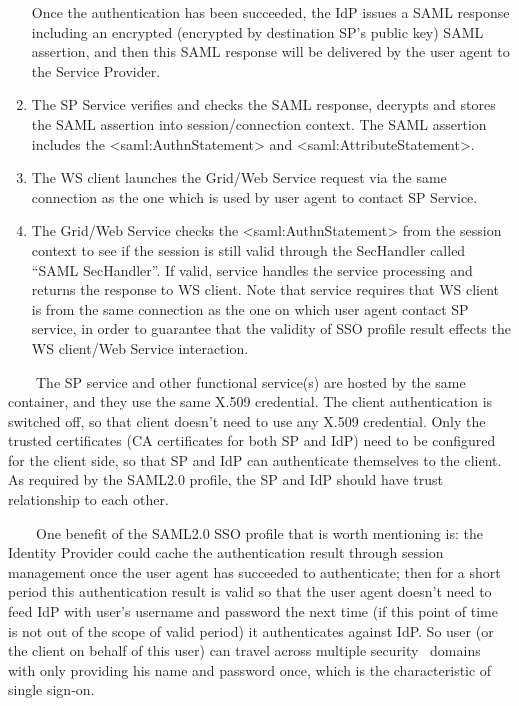 \documentclass{article}
\begin{document}
\begin{enumerate}
{Once the authentication has been succeeded, the IdP issues a SAML
response including an encrypted (encrypted by destination
SP{\textquoteright}s public key) SAML assertion, and then this SAML
response will be delivered by the user agent to the Service Provider.}
\item {\color{black}
The SP Service verifies and checks the SAML response, decrypts and
stores the SAML assertion into session/connection context. The SAML
assertion includes the {\textless}saml:AuthnStatement{\textgreater} and
{\textless}saml:AttributeStatement{\textgreater}.}
\item {\color{black}
The WS client launches the Grid/Web Service request via the same
connection as the one which is used by user agent to contact SP
Service.}
\item {\color{black}
The Grid/Web Service checks the
{\textless}saml:AuthnStatement{\textgreater} from the session context
to see if the session is still valid through the SecHandler called
{\textquotedblleft}SAML SecHandler{\textquotedblright}. If valid,
service handles the service processing and returns the response to WS
client. Note that service requires that WS client is from the same
connection as the one on which user agent contact SP service, in order
to guarantee that the validity of SSO profile result effects the WS
client/Web Service interaction.}
\end{enumerate}
{\upshape\color{black}
\ \ \ \ The SP service and other functional service(s) are hosted by the
same container, and they use the same X.509 credential. The client
authentication is switched off, so that client doesn{\textquoteright}t
need to use any X.509 credential. Only the trusted certificates (CA
certificates for both SP and IdP) need to be configured for the client
side, so that SP and IdP can authenticate themselves to the client. As
required by the SAML2.0 profile, the SP and IdP should have trust
relationship to each other.}

{\upshape\color{black}
\ \ \ \ One benefit of the SAML2.0 SSO profile that is worth mentioning
is: the Identity Provider could cache the authentication result through
session management once the user agent has succeeded to authenticate;
then for a short period this authentication result is valid so that the
user agent doesn{\textquoteright}t need to feed IdP with
user{\textquoteright}s username and password the next time (if this
point of time is not out of the scope of valid period) it authenticates
against IdP. So user (or the client on behalf of this user) can travel
across multiple security \ domains with only providing his name and
password once, which is the characteristic of single sign-on.}
\end{document}
